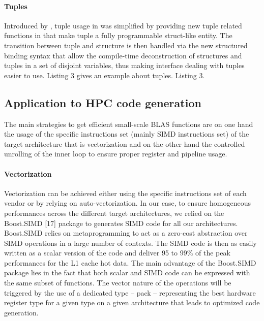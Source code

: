 \documentclass[../../main.tex]{subfiles}
\begin{document}
\begin{itemize}
\paragraph{Tuples} Introduced by , tuple usage in \cpp was
simplified by providing new tuple related functions in
 that make tuple a fully programmable struct-like
entity. The transition between tuple and structure is then
handled via the new structured binding syntax that allow
the compile-time deconstruction of structures and tuples
in a set of disjoint variables, thus making interface
dealing with tuples easier to use. Listing 3 gives an
example about tuples.
%
%
Listing 3.

\end{itemize}

\subsection{Application to HPC code generation}

The main strategies to get efficient small-scale BLAS
functions are on one hand the usage of the specific
instructions set (mainly SIMD instructions set) of the target
architecture that is vectorization and on the other hand the
controlled unrolling of the inner loop to ensure proper register
and pipeline usage.

\paragraph{Vectorization} Vectorization can be achieved either
using the specific instructions set of each vendor or
by relying on auto-vectorization. In our case, to ensure
homogeneous performances across the different target
architectures, we relied on the Boost.SIMD [17] package
to generates SIMD code for all our architectures.
Boost.SIMD relies on \cpp metaprogramming to act as
a zero-cost abstraction over SIMD operations in a large
number of contexts. The SIMD code is then as easily
written as a scalar version of the code and deliver 95%
to 99\% of the peak performances for the L1 cache hot
data. The main advantage of the Boost.SIMD package
lies in the fact that both scalar and SIMD code can
be expressed with the same subset of functions. The
vector nature of the operations will be triggered by
the use of a dedicated type – pack – representing the
best hardware register type for a given type on a given
architecture that leads to optimized code generation.
\end{document}
